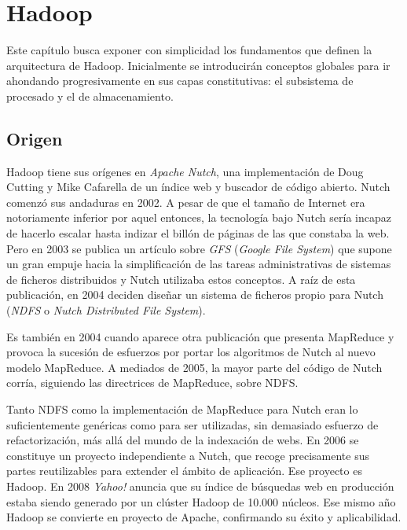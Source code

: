 \chapter{Hadoop}\label{cap:hadoop}
\noindent Este cap\'itulo busca exponer con simplicidad los fundamentos que definen la arquitectura de Hadoop. Inicialmente se introducir\'an conceptos globales para ir ahondando progresivamente en sus capas constitutivas: el subsistema de procesado y el de almacenamiento.


\section{Origen}\label{sec:origen}
\noindent Hadoop tiene sus or\'igenes en \emph{Apache Nutch}, una implementaci\'on de Doug Cutting y Mike Cafarella de un \'indice web y buscador de c\'odigo abierto. Nutch comenz\'o sus andaduras en 2002. A pesar de que el tama\~no de Internet era notoriamente inferior por aquel entonces, la tecnolog\'ia bajo Nutch ser\'ia incapaz de hacerlo escalar hasta indizar el bill\'on de p\'aginas de las que constaba la web. Pero en 2003 se publica un art\'iculo sobre \emph{GFS} (\emph{Google File System}) \cite{gfs} que supone un gran empuje hacia la simplificaci\'on de las tareas administrativas de sistemas de ficheros distribuidos y Nutch utilizaba estos conceptos. A ra\'iz de esta publicaci\'on, en 2004 deciden dise\~nar un sistema de ficheros propio para Nutch (\emph{NDFS} o \emph{Nutch Distributed File System}).\newline

Es tambi\'en en 2004 cuando aparece otra publicaci\'on \cite{googlemapreduce} que presenta MapReduce y provoca la sucesi\'on de esfuerzos por portar los algoritmos de Nutch al nuevo modelo MapReduce. A mediados de 2005, la mayor parte del c\'odigo de Nutch corr\'ia, siguiendo las directrices de MapReduce, sobre NDFS.\newline

Tanto NDFS como la implementaci\'on de MapReduce para Nutch eran lo suficientemente gen\'ericas como para ser utilizadas, sin demasiado esfuerzo de refactorizaci\'on, m\'as all\'a del mundo de la indexaci\'on de webs. En 2006 se constituye un proyecto independiente a Nutch, que recoge precisamente sus partes reutilizables para extender el \'ambito de aplicaci\'on. Ese proyecto es Hadoop. En 2008 \emph{Yahoo!} anuncia que su \'indice de b\'usquedas web en producci\'on estaba siendo generado por un cl\'uster Hadoop de 10.000 n\'ucleos. Ese mismo a\~no Hadoop se convierte en proyecto de Apache, confirmando su \'exito y aplicabilidad.\newline

